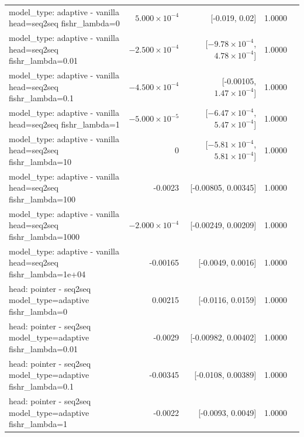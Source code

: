 \documentclass[10pt]{article}
\makeatletter
\newcommand{\stackcell}[1]{\begin{tabular}[t]{@{}l@{}}#1\end{tabular}}
\makeatother
\begin{document}
{\begin{longtable}{lrrrl}
\stackcell{model\_type: adaptive - vanilla\\\footnotesize head=seq2seq fishr\_lambda=0 } & $5.000\times10^{-4}$ & [-0.019, 0.02] & 1.0000 & \\
\stackcell{model\_type: adaptive - vanilla\\\footnotesize head=seq2seq fishr\_lambda=0.01 } & $-2.500\times10^{-4}$ & [$-9.78\times10^{-4}$, $4.78\times10^{-4}$] & 1.0000 & \\
\stackcell{model\_type: adaptive - vanilla\\\footnotesize head=seq2seq fishr\_lambda=0.1 } & $-4.500\times10^{-4}$ & [-0.00105, $1.47\times10^{-4}$] & 1.0000 & \\
\stackcell{model\_type: adaptive - vanilla\\\footnotesize head=seq2seq fishr\_lambda=1 } & $-5.000\times10^{-5}$ & [$-6.47\times10^{-4}$, $5.47\times10^{-4}$] & 1.0000 & \\
\stackcell{model\_type: adaptive - vanilla\\\footnotesize head=seq2seq fishr\_lambda=10 } & 0 & [$-5.81\times10^{-4}$, $5.81\times10^{-4}$] & 1.0000 & \\
\stackcell{model\_type: adaptive - vanilla\\\footnotesize head=seq2seq fishr\_lambda=100 } & -0.0023 & [-0.00805, 0.00345] & 1.0000 & \\
\stackcell{model\_type: adaptive - vanilla\\\footnotesize head=seq2seq fishr\_lambda=1000 } & $-2.000\times10^{-4}$ & [-0.00249, 0.00209] & 1.0000 & \\
\stackcell{model\_type: adaptive - vanilla\\\footnotesize head=seq2seq fishr\_lambda=1e+04 } & -0.00165 & [-0.0049, 0.0016] & 1.0000 & \\
\stackcell{head: pointer - seq2seq\\\footnotesize model\_type=adaptive fishr\_lambda=0 } & 0.00215 & [-0.0116, 0.0159] & 1.0000 & \\
\stackcell{head: pointer - seq2seq\\\footnotesize model\_type=adaptive fishr\_lambda=0.01 } & -0.0029 & [-0.00982, 0.00402] & 1.0000 & \\
\stackcell{head: pointer - seq2seq\\\footnotesize model\_type=adaptive fishr\_lambda=0.1 } & -0.00345 & [-0.0108, 0.00389] & 1.0000 & \\
\stackcell{head: pointer - seq2seq\\\footnotesize model\_type=adaptive fishr\_lambda=1 } & -0.0022 & [-0.0093, 0.0049] & 1.0000 & \\

\end{longtable}}
\end{document}
